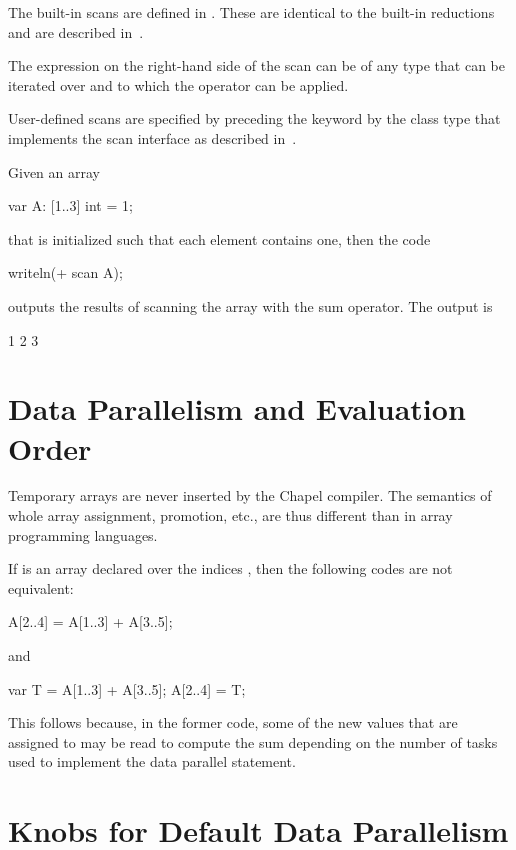 The built-in scans are defined in .  These
are identical to the built-in reductions and are described
in~.

The expression on the right-hand side of the scan can be of any type
that can be iterated over and to which the operator can be applied.

User-defined scans are specified by preceding the keyword 
by the class type that implements the scan interface as described
in~.

\begin{example}
Given an array
\begin{chapel}
var A: [1..3] int = 1;
\end{chapel}
that is initialized such that each element contains one, then the code
\begin{chapel}
writeln(+ scan A);
\end{chapel}
outputs the results of scanning the array with the sum operator.  The
output is
\begin{chapel}
1 2 3
\end{chapel}
\end{example}

\section{Data Parallelism and Evaluation Order}

Temporary arrays are never inserted by the Chapel compiler.  The
semantics of whole array assignment, promotion, etc., are thus
different than in array programming languages.

\begin{example}
If  is an array declared over the indices , then
the following codes are not equivalent:
\begin{chapel}
A[2..4] = A[1..3] + A[3..5];
\end{chapel}
and
\begin{chapel}
var T = A[1..3] + A[3..5];
A[2..4] = T;
\end{chapel}
This follows because, in the former code, some of the new values that
are assigned to  may be read to compute the sum depending on
the number of tasks used to implement the data parallel statement.
\end{example}

\section{Knobs for Default Data Parallelism}
\label{data_parallel_knobs}

